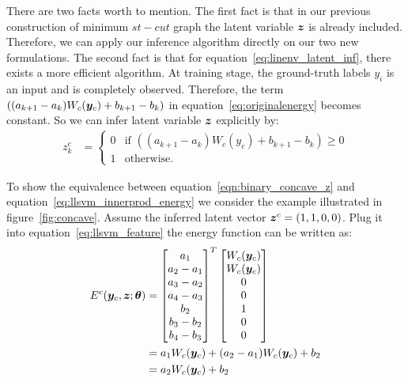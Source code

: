 There are two facts worth to mention. The first fact is that in
our previous construction of minimum $st-cut$ graph the latent
variable ${\bm{z}}$ is already included. Therefore, we can apply our
inference algorithm directly on our two new formulations. The
second fact is that for equation~\eqref{eq:linenv_latent_inf},
there exists a more efficient algorithm. At training stage, the
ground-truth labels $y_i$ is an input and is completely observed.
Therefore, the term $((a_{k+1}-a_k)W_c({\bm{y}}_c)+b_{k+1}-b_k)$ in
equation~\eqref{eq:originalenergy} becomes constant. So we can
infer latent variable ${\bm{z}}$ explicitly by:
\begin{align}
  \label{eq:linenv_effi_infer_latent}
  z_k^c &=
          \begin{cases}
            0 & \text{if $((a_{k+1}-a_k)W_c(y_c)+b_{k+1}-b_k)\geq0$} \\
            1 & \text{otherwise}.
          \end{cases}
\end{align}

To show the equivalence between
equation~\eqref{eqn:binary_concave_z} and
equation~\eqref{eq:llsvm_innerprod_energy} we consider the
example illustrated in figure~\ref{fig:concave}. Assume the
inferred latent vector ${\bm{z}}^c=(1,1,0,0)$. Plug it into
equation~\eqref{eq:llsvm_feature} the energy function can be
written as:
\begin{align*}
  E^c({\bm{y}}_c,{\bm{z}}; {\bm{\theta}}) &=
  \begin{bmatrix}
    a_1\\
    a_2-a_1\\
    a_3-a_2\\
    a_4-a_3\\
    b_2\\
    b_3-b_2\\
    b_4-b_3
  \end{bmatrix}^T
  \begin{bmatrix}
    W_c({\bm{y}}_c) \\
    W_c({\bm{y}}_c) \\
    0\\
    0\\
    1\\
    0\\
    0
  \end{bmatrix}\\
  &=a_1W_c({\bm{y}}_c)+(a_2-a_1)W_c({\bm{y}}_c)+b_2\\
  &=a_2W_c({\bm{y}}_c)+b_2
\end{align*}

